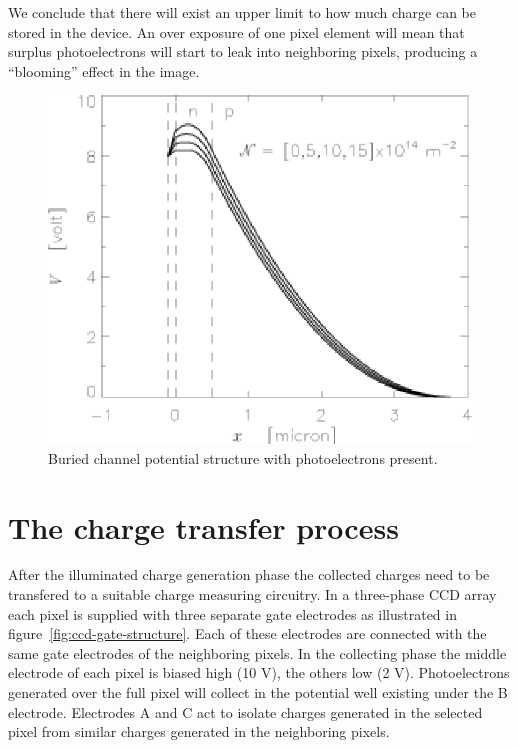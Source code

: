 We conclude that there will exist an upper limit to how much charge
can be stored in the device. An over exposure of one pixel element
will mean that surplus photoelectrons will start to leak into
neighboring pixels, producing a ``blooming'' effect in the image.

\begin{figure}[h]
  \centering
	\includegraphics{CCD_burchanph.eps}
  \caption{Buried channel potential structure with photoelectrons present.}
  \label{CCD.figburchanph}
\end{figure}

\section{The charge transfer process} 

After the illuminated charge generation phase the collected charges
need to be transfered to a suitable charge measuring circuitry. In a
three-phase CCD array each pixel is supplied with three separate gate
electrodes as illustrated in figure~\ref{fig:ccd-gate-structure}.
Each of these electrodes are connected with the
same gate electrodes of the neighboring pixels.  In the
collecting phase the middle electrode of each pixel is biased high (10
V), the others low (2 V). Photoelectrons generated over the full pixel
will collect in the potential well existing under the B electrode.
Electrodes A and C act to isolate charges generated in the selected
pixel from similar charges generated in the neighboring pixels.

